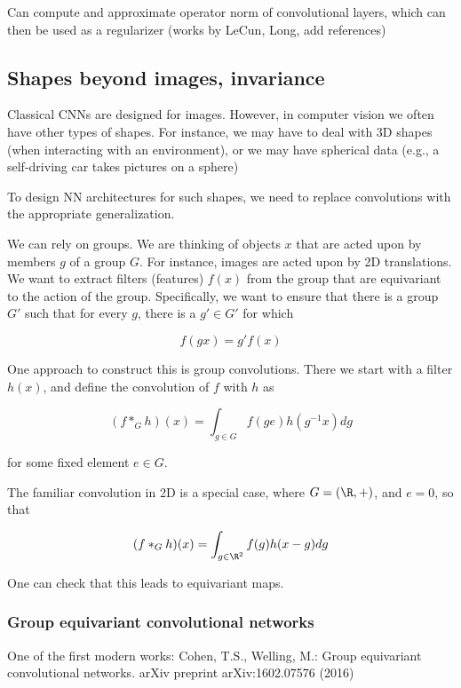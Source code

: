 \documentclass[english]{article}
\begin{document}
\item Can compute and approximate operator norm of convolutional layers, which can then be used as a regularizer (works by LeCun, Long, add references) 

\eenum



\subsection{Shapes beyond images, invariance}
%
\benum
\item Classical CNNs are designed for images. However, in computer vision we often have other types of shapes. For instance, we may have to deal with 3D shapes (when interacting with an environment), or we may have spherical data (e.g., a self-driving car takes pictures on a sphere)

\item To design NN architectures for such shapes, we need to replace convolutions with the appropriate generalization. 

\item We can rely on groups. We are thinking of objects $x$ that are acted upon by members $g$ of a group $G$. For instance, images are acted upon by 2D translations. We want to extract filters (features) $f(x)$ from the group that are equivariant to the action of the group. Specifically, we want to ensure that there is a group $G'$ such that for every $g$, there is a $g'\in G'$ for which

$$f(gx) = g'f(x)$$

\item One approach to construct this is group convolutions. There we start with a filter $h(x)$, and  define the convolution of $f$ with $h$ as

$$(f *_G h)(x) = \int_{g\in G} f(ge)h(g^{-1}x)dg$$

for some fixed element $e\in G$. 

The familiar convolution in 2D is a special case, where $G = (\R,+)$, and $e = 0$, so that 

$$(f *_G h)(x) = \int_{g\in \R^2} f(g)h(x-g)dg$$

One can check that this leads to equivariant maps.
\eenum

\subsubsection{Group equivariant convolutional networks}
\benum 
\item %
One of the first modern works:  Cohen, T.S., Welling, M.: Group equivariant convolutional networks. arXiv
preprint arXiv:1602.07576 (2016)
\end{document}
